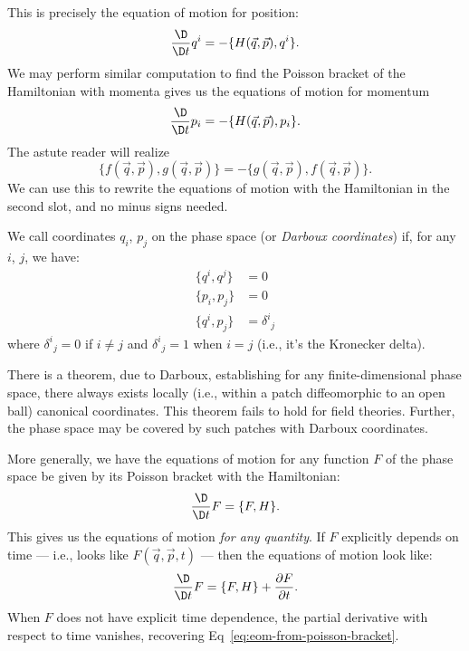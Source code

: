 This is precisely the equation of motion for position:
\begin{equation}
\frac{\D}{\D t}q^{i} = -\{H(\vec{q},\vec{p}), q^{i}\}.
\end{equation}
We may perform similar computation to find the Poisson bracket of the
Hamiltonian with momenta gives us the equations of motion for momentum
\begin{equation}
\frac{\D}{\D t}p_{i} = -\{H(\vec{q},\vec{p}), p_{i}\}.
\end{equation}
The astute reader will realize
\begin{equation}
\{f(\vec{q},\vec{p}), g(\vec{q},\vec{p})\}
=-\{g(\vec{q},\vec{p}), f(\vec{q},\vec{p})\}.
\end{equation}
We can use this to rewrite the equations of motion with the Hamiltonian
in the second slot, and no minus signs needed.

\begin{definition}
We call coordinates $q_{i}$, $p_{j}$ on the phase
space  (or \emph{Darboux coordinates}) if,
for any $i$, $j$, we have:
\begin{subequations}
\begin{align}
\{q^{i}, q^{j}\} &= 0\\
\{p_{i}, p_{j}\} &= 0\\
\{q^{i}, p_{j}\} &= {\delta^{i}}_{j}
\end{align}
\end{subequations}
where ${\delta^{i}}_{j}=0$ if $i\neq j$ and ${\delta^{i}}_{j}=1$ when $i=j$
(i.e., it's the Kronecker delta).
\end{definition}

\begin{remark}
There is a theorem, due to Darboux, establishing for any
finite-dimensional phase space, there always exists locally (i.e.,
within a patch diffeomorphic to an open ball) canonical coordinates.
This theorem fails to hold for field theories. Further, the phase space
may be covered by such patches with Darboux coordinates.
\end{remark}

\M
More generally, we have the equations of motion for any function $F$ of
the phase space be given by its Poisson bracket with the Hamiltonian:
\begin{equation}\label{eq:eom-from-poisson-bracket}
\frac{\D}{\D t}F = \{F, H\}.
\end{equation}
This gives us the equations of motion \emph{for any quantity}. If $F$
explicitly depends on time --- i.e., looks like $F(\vec{q},\vec{p},t)$
--- then the equations of motion look like:
\begin{equation}
\frac{\D}{\D t}F = \{F, H\} + \frac{\partial F}{\partial t}.
\end{equation}
When $F$ does not have explicit time dependence, the partial derivative
with respect to time vanishes, recovering Eq~\eqref{eq:eom-from-poisson-bracket}.

